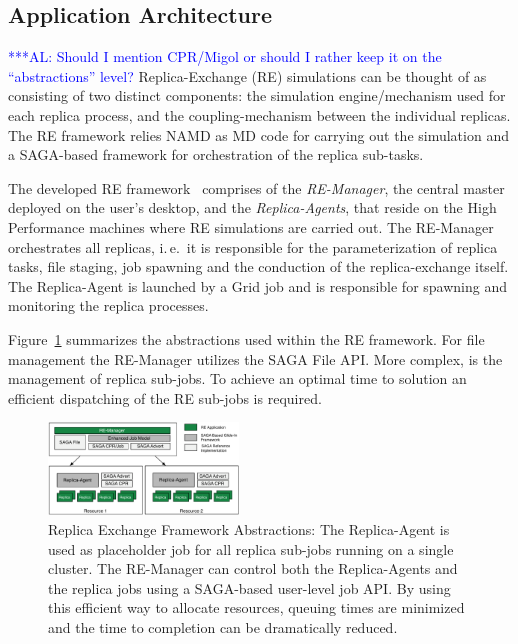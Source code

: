 \documentclass[conference,final]{IEEEtran}
\newcommand{\alnote}[1]{ {\textcolor{blue} { ***AL: #1 }}}
\newcommand{\alnote}[1]{}
\begin{document}
\subsection{Application Architecture}
\alnote{Should I mention CPR/Migol or should I rather keep it on the 
``abstractions'' level?}
Replica-Exchange (RE) simulations can be thought of as consisting of
two distinct components: the  simulation engine/mechanism
used for each replica process, and the coupling-mechanism between the
individual replicas. The RE framework relies NAMD as MD code for 
carrying out the simulation and a SAGA-based framework 
for orchestration of the replica sub-tasks. 

The developed RE framework~\cite{Luckow:2008la} comprises of the \emph{RE-Manager}, the central master 
deployed on the user's desktop, and the  \textit{Replica-Agents}, 
that reside on the High Performance machines where RE simulations
are carried out. The RE-Manager orchestrates all replicas, i.\,e.\ 
it is responsible for the parameterization of replica tasks, 
file staging, job spawning and the conduction of the replica-exchange itself.
The Replica-Agent is launched by a Grid job and is
responsible for spawning and monitoring the replica processes. 

Figure~\ref{fig:remdmanager_v11} summarizes the abstractions used within the RE framework.
For file management the RE-Manager utilizes the SAGA File API. More complex, 
is the management of replica sub-jobs. To achieve an optimal time to solution
an efficient dispatching of the RE sub-jobs is required.  

\begin{figure}[htbp]
    \centering
        \includegraphics[width=0.45\textwidth]{remdmanager_v11.pdf}
    \caption{Replica Exchange Framework Abstractions:      
          The Replica-Agent is used as placeholder job for
          all replica sub-jobs running on a single cluster. The
          RE-Manager can control both the Replica-Agents and the replica
          jobs using a SAGA-based user-level job API. By using this
          efficient way to allocate resources, queuing times are minimized
          and the time to completion can be dramatically reduced.}
    \label{fig:remdmanager_v11}
\end{figure}  
\end{document}
